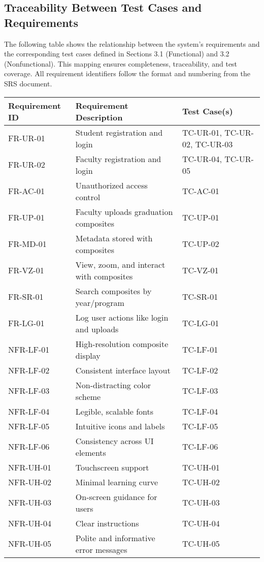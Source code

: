 \documentclass[12pt, titlepage]{article}
\begin{document}
\subsection{Traceability Between Test Cases and Requirements}

The following table shows the relationship between the system's requirements and the corresponding test cases defined in Sections 3.1 (Functional) and 3.2 (Nonfunctional). This mapping ensures completeness, traceability, and test coverage. All requirement identifiers follow the format and numbering from the SRS document.

\begin{longtable}{|p{3cm}|p{7cm}|p{4cm}|}
\hline
\textbf{Requirement ID} & \textbf{Requirement Description} & \textbf{Test Case(s)} \\
\hline
FR-UR-01 & Student registration and login & TC-UR-01, TC-UR-02, TC-UR-03 \\
FR-UR-02 & Faculty registration and login & TC-UR-04, TC-UR-05 \\
FR-AC-01 & Unauthorized access control & TC-AC-01 \\
FR-UP-01 & Faculty uploads graduation composites & TC-UP-01 \\
FR-MD-01 & Metadata stored with composites & TC-UP-02 \\
FR-VZ-01 & View, zoom, and interact with composites & TC-VZ-01 \\
FR-SR-01 & Search composites by year/program & TC-SR-01 \\
FR-LG-01 & Log user actions like login and uploads & TC-LG-01 \\
NFR-LF-01 & High-resolution composite display & TC-LF-01 \\
NFR-LF-02 & Consistent interface layout & TC-LF-02 \\
NFR-LF-03 & Non-distracting color scheme & TC-LF-03 \\
NFR-LF-04 & Legible, scalable fonts & TC-LF-04 \\
NFR-LF-05 & Intuitive icons and labels & TC-LF-05 \\
NFR-LF-06 & Consistency across UI elements & TC-LF-06 \\
NFR-UH-01 & Touchscreen support & TC-UH-01 \\
NFR-UH-02 & Minimal learning curve & TC-UH-02 \\
NFR-UH-03 & On-screen guidance for users & TC-UH-03 \\
NFR-UH-04 & Clear instructions & TC-UH-04 \\
NFR-UH-05 & Polite and informative error messages & TC-UH-05 \\

\end{longtable}
\end{document}
